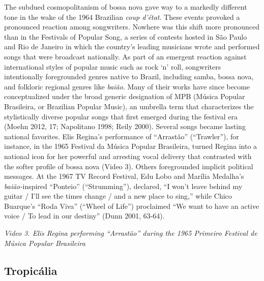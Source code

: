 \documentclass[twoside]{article}
\begin{document}
The subdued cosmopolitanism of bossa nova gave way to a markedly
different tone in the wake of the 1964 Brazilian \emph{coup d'état}.
These events provoked a pronounced reaction among songwriters\emph{.}
Nowhere was this shift more pronounced than in the Festivals of Popular
Song, a series of contests hosted in São Paulo and Rio de Janeiro in
which the country's leading musicians wrote and performed songs that
were broadcast nationally. As part of an emergent reaction against
international styles of popular music such as rock `n' roll, songwriters
intentionally foregrounded genres native to Brazil, including samba,
bossa nova, and folkloric regional genres like \emph{baião}. Many of
their works have since become conceptualized under the broad generic
designation of MPB (Música Popular Brasileira, or Brazilian Popular
Music), an umbrella term that characterizes the stylistically diverse
popular songs that first emerged during the festival era (Moehn 2012,
17; Napolitano 1998; Reily 2000). Several songs became lasting national
favorites. Elis Regina's performance of ``Arrastão'' (``Trawler''), for
instance, in the 1965 Festival da Música Popular Brasileira, turned
Regina into a national icon for her powerful and arresting vocal
delivery that contrasted with the softer profile of bossa nova (Video
3). Others foregrounded implicit political messages. At the 1967 TV
Record Festival, Edu Lobo and Marília Medalha's \emph{baião-}inspired
``Ponteio'' (``Strumming''), declared, ``I won't leave behind my guitar
/ I'll see the times change / and a new place to sing,'' while Chico
Buarque's ``Roda Viva'' (``Wheel of Life'') proclaimed ``We want to have
an active voice / To lead in our destiny'' (Dunn 2001, 63-64).

\emph{Video 3. Elis Regina performing ``Arrastão'' during the 1965
Primeiro Festival de Música Popular Brasileira}

\hypertarget{tropicuxe1lia}{%
\subsection*{Tropicália}\label{tropicuxe1lia}}
\end{document}
